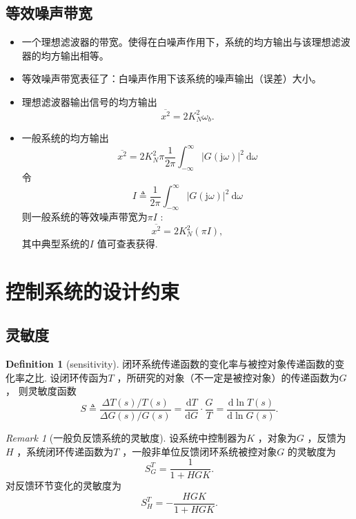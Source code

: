 \documentclass[14pt,a4paper]{article}
\theoremstyle{plain}
\theoremstyle{definition}
\newtheorem*{dfn}{Definition}
\theoremstyle{remark}
\newtheorem{rmk}{Remark}[section]
\theoremstyle{plain}
\theoremstyle{plain}
\theoremstyle{definition}
\begin{document}
		\subsection{等效噪声带宽}%
		\label{sub:等效噪声带宽}
		
			\begin{itemize}
				\item 一个理想滤波器的带宽。使得在白噪声作用下，系统的均方输出与该理想滤波器的均方输出相等。
				\item 等效噪声带宽表征了：白噪声作用下该系统的噪声输出（误差）大小。
				\item 理想滤波器输出信号的均方输出
					\[
					\overline{x^2} = 2K_N^2 \omega_{b}
					.\] 
				\item 一般系统的均方输出
					\[
						\overline{x^2} = 2K^2_N \pi \dfrac{1}{2\pi} \int_{-\infty}^\infty \left| G(\mathrm{j} \omega ) \right|^2 \ \mathrm d\omega 
					\] 
					令
					 \[
						I\triangleq  \dfrac{1}{2\pi} \int_{-\infty}^\infty \left| G(\mathrm{j} \omega ) \right|^2 \ \mathrm d\omega 
					\]
					则一般系统的等效噪声带宽为$\pi I$ : 
					 \[
						 \overline{x^2} = 2K_N^2(\pi I)
					,\] 
					其中典型系统的$I$ 值可查表获得. 
			\end{itemize}  	


	\newpage
	\section{控制系统的设计约束}%
	\label{sec:控制系统的设计约束}
	
		\subsection{灵敏度}%
		\label{sub:灵敏度}
		
			\begin{dfn}[sensitivity]  
			\label{dfn:sensitivity}
				闭环系统传递函数的变化率与被控对象传递函数的变化率之比. 设闭环传函为$T$ ，所研究的对象（不一定是被控对象）的传递函数为$G$， 
				则灵敏度函数
				\[
					S \triangleq \dfrac{\Delta T(s) / T(s)}{\Delta G(s) / G(s)} =\dfrac{\mathrm d T}{\mathrm d G} \cdot \dfrac{G}{T} = \dfrac{\mathrm d \ln T(s)}{\mathrm d \ln G(s)} 
				.\] 
			\end{dfn} 

			\begin{rmk}[一般负反馈系统的灵敏度]  
			\label{rmk:一般负反馈系统的灵敏度}
				设系统中控制器为$K$ ，对象为$G$ ，反馈为$H$ ，系统闭环传递函数为$T$ ，一般非单位反馈闭环系统被控对象$G$ 的灵敏度为
				\[
				S^{T}_G = \dfrac{1}{1+HGK}
				.\] 
				对反馈环节变化的灵敏度为
				\[
				S^{T}_H = - \dfrac{HGK}{1+HGK}	
				.\] 
			\end{rmk} 
\end{document}
